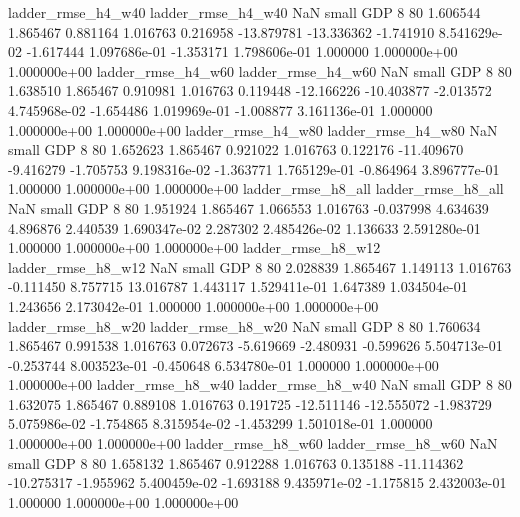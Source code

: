       ladder_rmse_h4_w40       ladder_rmse_h4_w40                   NaN      small      GDP                 8 80 1.606544       1.865467 0.881164       1.016763    0.216958    -13.879781    -13.336362    -1.741910   8.541629e-02 -1.617444 1.097686e-01    -1.353171   1.798606e-01            1.000000    1.000000e+00        1.000000e+00
      ladder_rmse_h4_w60       ladder_rmse_h4_w60                   NaN      small      GDP                 8 80 1.638510       1.865467 0.910981       1.016763    0.119448    -12.166226    -10.403877    -2.013572   4.745968e-02 -1.654486 1.019969e-01    -1.008877   3.161136e-01            1.000000    1.000000e+00        1.000000e+00
      ladder_rmse_h4_w80       ladder_rmse_h4_w80                   NaN      small      GDP                 8 80 1.652623       1.865467 0.921022       1.016763    0.122176    -11.409670     -9.416279    -1.705753   9.198316e-02 -1.363771 1.765129e-01    -0.864964   3.896777e-01            1.000000    1.000000e+00        1.000000e+00
      ladder_rmse_h8_all       ladder_rmse_h8_all                   NaN      small      GDP                 8 80 1.951924       1.865467 1.066553       1.016763   -0.037998      4.634639      4.896876     2.440539   1.690347e-02  2.287302 2.485426e-02     1.136633   2.591280e-01            1.000000    1.000000e+00        1.000000e+00
      ladder_rmse_h8_w12       ladder_rmse_h8_w12                   NaN      small      GDP                 8 80 2.028839       1.865467 1.149113       1.016763   -0.111450      8.757715     13.016787     1.443117   1.529411e-01  1.647389 1.034504e-01     1.243656   2.173042e-01            1.000000    1.000000e+00        1.000000e+00
      ladder_rmse_h8_w20       ladder_rmse_h8_w20                   NaN      small      GDP                 8 80 1.760634       1.865467 0.991538       1.016763    0.072673     -5.619669     -2.480931    -0.599626   5.504713e-01 -0.253744 8.003523e-01    -0.450648   6.534780e-01            1.000000    1.000000e+00        1.000000e+00
      ladder_rmse_h8_w40       ladder_rmse_h8_w40                   NaN      small      GDP                 8 80 1.632075       1.865467 0.889108       1.016763    0.191725    -12.511146    -12.555072    -1.983729   5.075986e-02 -1.754865 8.315954e-02    -1.453299   1.501018e-01            1.000000    1.000000e+00        1.000000e+00
      ladder_rmse_h8_w60       ladder_rmse_h8_w60                   NaN      small      GDP                 8 80 1.658132       1.865467 0.912288       1.016763    0.135188    -11.114362    -10.275317    -1.955962   5.400459e-02 -1.693188 9.435971e-02    -1.175815   2.432003e-01            1.000000    1.000000e+00        1.000000e+00
